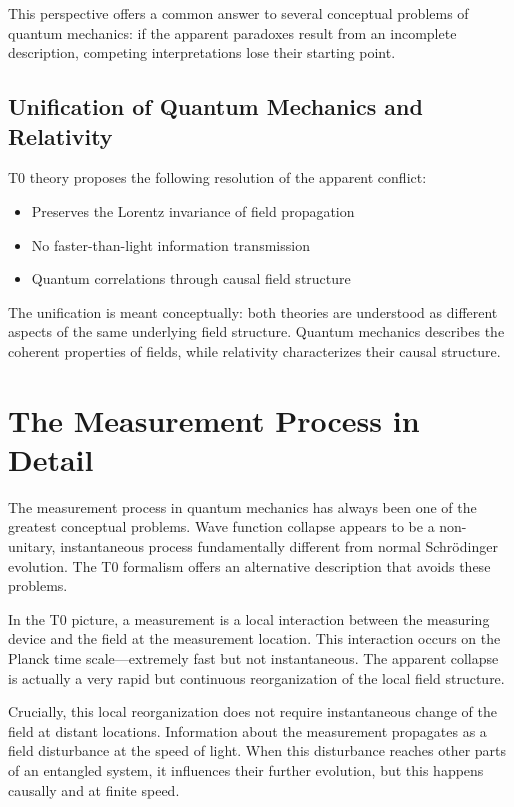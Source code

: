 	This perspective offers a common answer to several conceptual problems of quantum mechanics: if the apparent paradoxes result from an incomplete description, competing interpretations lose their starting point.
	
	\subsection{Unification of Quantum Mechanics and Relativity}
	
	T0 theory proposes the following resolution of the apparent conflict:
	\begin{itemize}
		\item Preserves the Lorentz invariance of field propagation
		\item No faster-than-light information transmission
		\item Quantum correlations through causal field structure
	\end{itemize}
	
	The unification is meant conceptually: both theories are understood as different aspects of the same underlying field structure. Quantum mechanics describes the coherent properties of fields, while relativity characterizes their causal structure.
	
	\section{The Measurement Process in Detail}
	
	The measurement process in quantum mechanics has always been one of the greatest conceptual problems. Wave function collapse appears to be a non-unitary, instantaneous process fundamentally different from normal Schrödinger evolution. The T0 formalism offers an alternative description that avoids these problems.
	
	In the T0 picture, a measurement is a local interaction between the measuring device and the field at the measurement location. This interaction occurs on the Planck time scale—extremely fast but not instantaneous. The apparent collapse is actually a very rapid but continuous reorganization of the local field structure.
	
	Crucially, this local reorganization does not require instantaneous change of the field at distant locations. Information about the measurement propagates as a field disturbance at the speed of light. When this disturbance reaches other parts of an entangled system, it influences their further evolution, but this happens causally and at finite speed.
	
